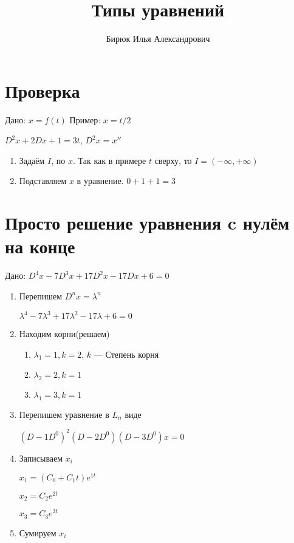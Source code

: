 \documentclass[a4paper, 12pt]{article}
\title{Типы уравнений}
\author{Бирюк Илья Александрович}
\begin{document}
\maketitle
\newpage
\tableofcontents
\newpage
\section{Проверка}
Дано: $x=f(t)$ 
Пример: $x=t/2$

$D^2x+2Dx+1=3t$, $D^2x = x''$
\begin{enumerate}
    \item Задаём $I$, по $x$. Так как в примере $t$ сверху, то $I=(-\infty, +\infty)$
    \item Подставляем $x$ в уравнение.
    $0+1+1=3$
\end{enumerate}
\section{Просто решение уравнения c нулём на конце}
Дано: $D^4x-7D^3x+17D^2x-17Dx+6=0$
\begin{enumerate}
    \item Перепишем $D^nx=\lambda^n$
    
    $\lambda^4-7\lambda^3+17\lambda^2-17\lambda+6=0$
    \item Находим корни(решаем)
    \begin{enumerate}
        \item $\lambda_1=1,k=2$, $k$ --- Степень корня
        \item $\lambda_2=2,k=1$
        \item $\lambda_1=3,k=1$
    \end{enumerate}
    \item Перепишем уравнение в $L_n$ виде
    
    $(D-1D^0)^2(D-2D^0)(D-3D^0)x=0$
    \item Записываем $x_i$
    
    $x_1=(C_0+C_1t)e^{1t}$

    $x_2=C_2e^{2t}$

    $x_3=C_3e^{3t}$
    \item Сумируем $x_i$
\end{enumerate}
\end{document}
